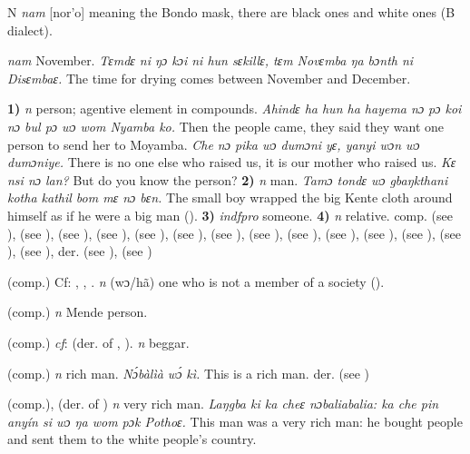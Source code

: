 \begin{letter}{N}
 \textit{nam} [nor'o] meaning the Bondo mask, there are black ones and white ones (B dialect). 

 \textit{nam} November. \textit{Tɛmdɛ ni ŋɔ kɔi ni hun sɛkillɛ, tɛm Novɛmba ŋa bɔnth ni Disɛmbaɛ.} The time for drying comes between November and December.

 \textbf{1)} \textit{n} person; agentive element in compounds. \textit{Ahindɛ ha hun ha hayema nɔ pɔ koi nɔ bul pɔ wɔ wom Nyamba ko.} Then the people came, they said they want one person to send her to Moyamba. \textit{Che nɔ pika wɔ dumɔni yɛ, yanyi wɔn wɔ dumɔniye.} There is no one else who raised us, it is our mother who raised us. \textit{Kɛ nsi nɔ lan?} But do you know the person? \textbf{2)} \textit{n} man. \textit{Tamɔ tondɛ wɔ gbaŋkthani kotha kathil bom mɛ nɔ bɛn.} The small boy wrapped the big Kente cloth around himself as if he were a big man (\citealt{Pichl1967}). \textbf{3)} \textit{indfpro} someone. \textbf{4)} \textit{n} relative. comp.  (see ),  (see ),  (see ),  (see ),  (see ),  (see ),  (see ),  (see ),  (see ),  (see ),  (see ),  (see ),  (see ),  (see ), der.  (see ),  (see )

 (comp.) Cf: , , . \textit{n} (wɔ/hã) one who is not a member of a society (\citealt{Pichl1967}). 

 (comp.) \textit{n} Mende person.

 (comp.) \textit{cf}:  (der. of , ). \textit{n} beggar.

 (comp.) \textit{n} rich man. \textit{Nɔ́bàlìà wɔ́ kì.} This is a rich man. der.  (see ) 

 (comp.), (der. of ) \textit{n} very rich man. \textit{Laŋgba ki ka cheɛ nɔbaliabalia: ka che pin anyín si wɔ ŋa wom pɔk Pothoɛ.} This man was a very rich man: he bought people and sent them to the white people's country.


\end{letter}
